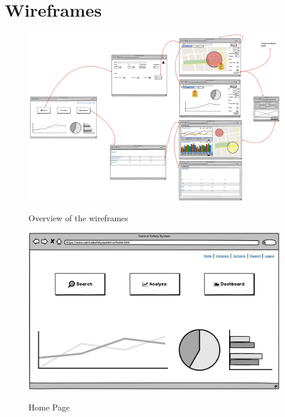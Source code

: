 \documentclass[../main.tex]{subfiles}
\begin{document}
    \section{Wireframes}\label{sec:wireframes-screen}
    \begin{figure}[H]
        \centering
        \includegraphics[scale = 0.35]{assets/wireframes/wire_sum.png} \\
        \caption[]{Overview of the wireframes}\label{fig:figure5}
    \end{figure}
    \begin{figure}[H]
        \centering
        \includegraphics[scale = 0.32]{assets/wireframes/wire1.png} \\
        \caption[]{Home Page}\label{fig:figure6}
    \end{figure}
\end{document}
